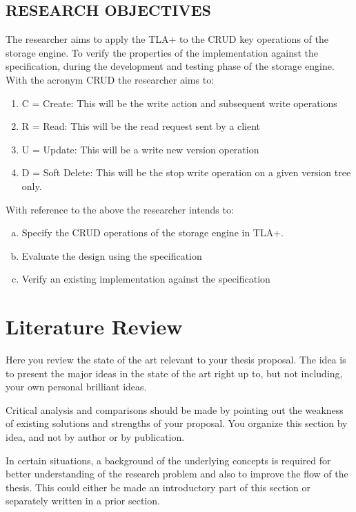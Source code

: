 \documentclass[11pt,a4paper,oneside]{book} %
\numberwithin{equation}{section}
\begin{document}
\section{RESEARCH OBJECTIVES}
The researcher aims to apply the TLA+ to the CRUD key operations of the storage engine. To
verify the properties of the implementation against the specification, during the development
and testing phase of the storage engine.
With the acronym CRUD the researcher aims to:
\begin{enumerate}

\item C = Create:
This will be the write action and subsequent write operations
\item R = Read:
This will be the read request sent by a client
\item U = Update:
This will be a write new version operation
\item D = Soft Delete:
This will be the stop write operation on a given version tree only.
\end{enumerate}
With reference to the above the researcher intends to:
\begin{enumerate}[(a)] %
\item Specify the CRUD operations of the storage engine in TLA+.
\item Evaluate the design using the specification
\item Verify an existing implementation against the specification

\end{enumerate}




\chapter{Literature Review}\label{c-review}
Here you review the state of the art relevant to your thesis proposal. The idea is to present the major ideas in the state of the art right up to, but not including, your own personal brilliant ideas.

Critical analysis and comparisons should be made by pointing out the weakness of existing solutions and strengths of your proposal. You organize this section by idea, and not by author or by publication.

In certain situations, a background of the underlying concepts is required for better understanding of the research problem and also to improve the flow of the thesis. This could either be made an introductory part of this section or separately written in a prior section.
\end{document}
